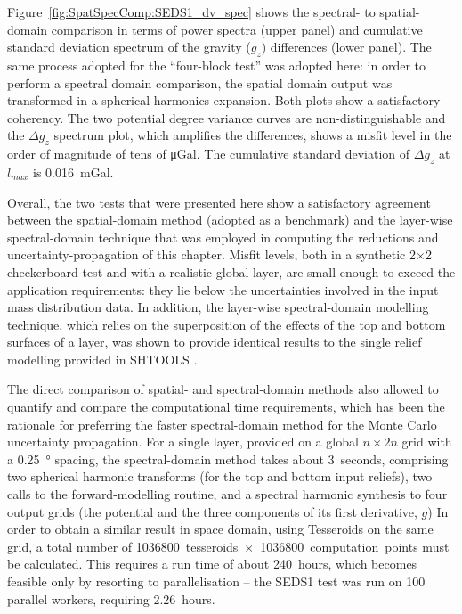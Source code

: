 \begin{subappendices}
Figure~\ref{fig:SpatSpecComp:SEDS1_dv_spec} shows the spectral- to spatial-domain comparison in terms of power spectra (upper panel) and cumulative standard deviation spectrum of the gravity ($g_z$) differences (lower panel).
The same process adopted for the ``four-block test'' was adopted here: in order to perform a spectral domain comparison, the spatial domain output was transformed in a spherical harmonics expansion.
Both plots show a satisfactory coherency.
The two potential degree variance curves are non-distinguishable and the $\Delta g_z$ spectrum plot, which amplifies the differences, shows a misfit level in the order of magnitude of tens of \si{\micro Gal}.
The cumulative standard deviation of  $\Delta g_z$ at $l_{max}$ is \SI{0.016}{\milli Gal}.


Overall, the two tests that were presented here show a satisfactory agreement between the spatial-domain method (adopted as a benchmark) and the layer-wise spectral-domain technique that was employed in computing the reductions and uncertainty-propagation of this chapter.
Misfit levels, both in a synthetic 2$\times$2 checkerboard test and with a realistic global layer, are small enough to exceed the application requirements: they lie below the uncertainties involved in the input mass distribution data.
In addition, the layer-wise spectral-domain modelling technique, which relies on the superposition of the effects of the top and bottom surfaces of a layer, was shown to provide identical results to the single relief modelling provided in SHTOOLS \parencite{Wieczorek2018}.

The direct comparison of spatial- and spectral-domain methods also allowed to quantify and compare the computational time requirements, which has been the rationale for preferring the faster spectral-domain method for the Monte Carlo uncertainty propagation.
For a single layer, provided on a global $n \times 2n$ grid with a \SI{0.25}{\degree} spacing, the spectral-domain method takes about 3~seconds, comprising two spherical harmonic transforms (for the top and bottom input reliefs), two calls to the forward-modelling routine, and a spectral harmonic synthesis to four output grids (the potential and the three components of its first derivative, $g$)
In order to obtain a similar result in space domain, using Tesseroids \parencite{UiedaTesseroids} on the same grid, a total number of \SI{1036800}{tesseroids}~$\times$~\SI{1036800}{computation points} must be calculated.
This requires a run time of about \SI{240}{hours}, which becomes feasible only by resorting to parallelisation -- the SEDS1 test was run on \num{100} parallel workers, requiring \SI{2.26}{hours}.


\end{subappendices}

